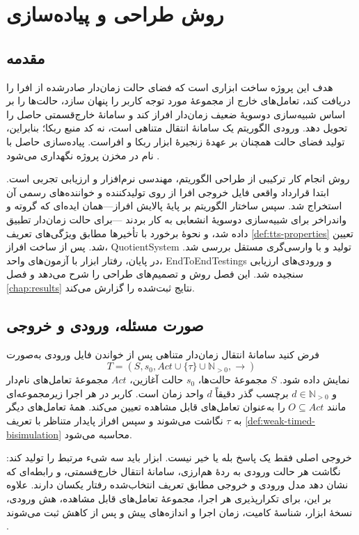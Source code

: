\chapter{روش طراحی و پیاده‌سازی}
\label{chap:method}

\section{مقدمه}

هدف این پروژه ساخت ابزاری است که فضای حالت زمان‌دار صادرشده از افرا را دریافت کند، تعامل‌های خارج از مجموعهٔ مورد توجه کاربر را پنهان سازد، حالت‌ها را بر اساس شبیه‌سازی دوسویهٔ ضعیف زمان‌دار افراز کند و سامانهٔ خارج‌قسمتی حاصل را تحویل دهد. ورودی الگوریتم یک سامانهٔ انتقال متناهی است، نه کد منبع ربکا؛ بنابراین، تولید فضای حالت همچنان بر عهدهٔ زنجیرهٔ ابزار ربکا و افراست. پیاده‌سازی حاصل با نام  در مخزن پروژه نگهداری می‌شود \cite{AfraWeakTimedReduction2026}.

روش انجام کار ترکیبی از طراحی الگوریتم، مهندسی نرم‌افزار و ارزیابی تجربی است. ابتدا قرارداد واقعی فایل خروجی افرا از روی تولیدکننده و خواننده‌های رسمی آن استخراج شد. سپس ساختار الگوریتم بر پایهٔ پالایش افراز—همان ایده‌ای که گروته و واندراخر برای شبیه‌سازی دوسویهٔ انشعابی به کار بردند \cite{GrooteVaandrager1990}—برای حالت زمان‌دار تطبیق داده شد، و نحوهٔ برخورد با تأخیرها مطابق ویژگی‌های تعریف \ref{def:tts-properties} تعیین شد. پس از ساخت افراز، \gls{QuotientSystem} تولید و با وارسی‌گری مستقل بررسی شد. در پایان، رفتار ابزار با آزمون‌های واحد، \glspl{EndToEndTesting} و ورودی‌های ارزیابی سنجیده شد. این فصل روش و تصمیم‌های طراحی را شرح می‌دهد و فصل \ref{chap:results} نتایج ثبت‌شده را گزارش می‌کند.

\section{صورت مسئله، ورودی و خروجی}

فرض کنید سامانهٔ انتقال زمان‌دار متناهی پس از خواندن فایل ورودی به‌صورت
\[
T=(S,s_0,\mathit{Act}\cup\{\tau\}\cup\mathbb{N}_{>0},\rightarrow)
\]
نمایش داده شود. $S$ مجموعهٔ حالت‌ها، $s_0$ حالت آغازین، $\mathit{Act}$ مجموعهٔ تعامل‌های نام‌دار و $d\in\mathbb{N}_{>0}$ برچسب گذر دقیقاً $d$ واحد زمان است. کاربر در هر اجرا زیرمجموعه‌ای مانند $O\subseteq\mathit{Act}$ را به‌عنوان تعامل‌های قابل مشاهده تعیین می‌کند. همهٔ تعامل‌های دیگر به $\tau$ نگاشت می‌شوند و سپس افراز پایدار متناظر با تعریف \ref{def:weak-timed-bisimulation} محاسبه می‌شود.

خروجی اصلی فقط یک پاسخ بله یا خیر نیست. ابزار باید سه شیء مرتبط را تولید کند: نگاشت هر حالت ورودی به ردهٔ هم‌ارزی، سامانهٔ انتقال خارج‌قسمتی، و رابطه‌ای که نشان دهد مدل ورودی و خروجی مطابق تعریف انتخاب‌شده رفتار یکسان دارند. علاوه بر این، برای تکرارپذیری هر اجرا، مجموعهٔ تعامل‌های قابل مشاهده، هش ورودی، نسخهٔ ابزار، شناسهٔ کامیت، زمان اجرا و اندازه‌های پیش و پس از کاهش ثبت می‌شوند \cite{AfraWeakTimedReduction2026}.

